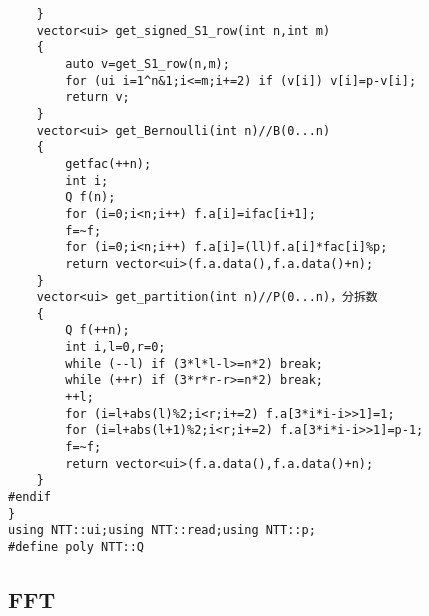 \documentclass{ctexart}
\begin{document}
\begin{lstlisting}
	}
	vector<ui> get_signed_S1_row(int n,int m)
	{
		auto v=get_S1_row(n,m);
		for (ui i=1^n&1;i<=m;i+=2) if (v[i]) v[i]=p-v[i];
		return v;
	}
	vector<ui> get_Bernoulli(int n)//B(0...n)
	{
		getfac(++n);
		int i;
		Q f(n);
		for (i=0;i<n;i++) f.a[i]=ifac[i+1];
		f=~f;
		for (i=0;i<n;i++) f.a[i]=(ll)f.a[i]*fac[i]%p;
		return vector<ui>(f.a.data(),f.a.data()+n);
	}
	vector<ui> get_partition(int n)//P(0...n)，分拆数
	{
		Q f(++n);
		int i,l=0,r=0;
		while (--l) if (3*l*l-l>=n*2) break;
		while (++r) if (3*r*r-r>=n*2) break;
		++l;
		for (i=l+abs(l)%2;i<r;i+=2) f.a[3*i*i-i>>1]=1;
		for (i=l+abs(l+1)%2;i<r;i+=2) f.a[3*i*i-i>>1]=p-1;
		f=~f;
		return vector<ui>(f.a.data(),f.a.data()+n);
	}
#endif
}
using NTT::ui;using NTT::read;using NTT::p;
#define poly NTT::Q
\end{lstlisting}

\subsection{FFT}
\end{document}
